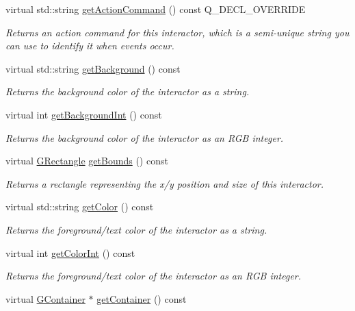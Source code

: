 \begin{DoxyCompactItemize}
virtual std\+::string \mbox{\hyperlink{classGButton_a90f2b1e6f6e7dabd9d6e5307f7c6d1b7}{get\+Action\+Command}} () const Q\+\_\+\+D\+E\+C\+L\+\_\+\+O\+V\+E\+R\+R\+I\+DE
\begin{DoxyCompactList}\small\item\em Returns an action command for this interactor, which is a semi-\/unique string you can use to identify it when events occur. \end{DoxyCompactList}\item 
virtual std\+::string \mbox{\hyperlink{classGInteractor_a808e22cc1fdfbecf71ed8c64ef4600e0}{get\+Background}} () const
\begin{DoxyCompactList}\small\item\em Returns the background color of the interactor as a string. \end{DoxyCompactList}\item 
virtual int \mbox{\hyperlink{classGInteractor_a9e827257a55cb8cf4d9de2ec6bcfd7a0}{get\+Background\+Int}} () const
\begin{DoxyCompactList}\small\item\em Returns the background color of the interactor as an R\+GB integer. \end{DoxyCompactList}\item 
virtual \mbox{\hyperlink{classGRectangle}{G\+Rectangle}} \mbox{\hyperlink{classGInteractor_a29e6ac35a0b48f491a4c88194cc5da3b}{get\+Bounds}} () const
\begin{DoxyCompactList}\small\item\em Returns a rectangle representing the x/y position and size of this interactor. \end{DoxyCompactList}\item 
virtual std\+::string \mbox{\hyperlink{classGInteractor_aa061dfa488c31e18549d64363c1d0e34}{get\+Color}} () const
\begin{DoxyCompactList}\small\item\em Returns the foreground/text color of the interactor as a string. \end{DoxyCompactList}\item 
virtual int \mbox{\hyperlink{classGInteractor_a9635c7af766cdc3417f346683fa0e6c1}{get\+Color\+Int}} () const
\begin{DoxyCompactList}\small\item\em Returns the foreground/text color of the interactor as an R\+GB integer. \end{DoxyCompactList}\item 
virtual \mbox{\hyperlink{classGContainer}{G\+Container}} $\ast$ \mbox{\hyperlink{classGInteractor_a7a6e317c29d61030929b4cd2d1c00fe7}{get\+Container}} () const

\end{DoxyCompactItemize}
